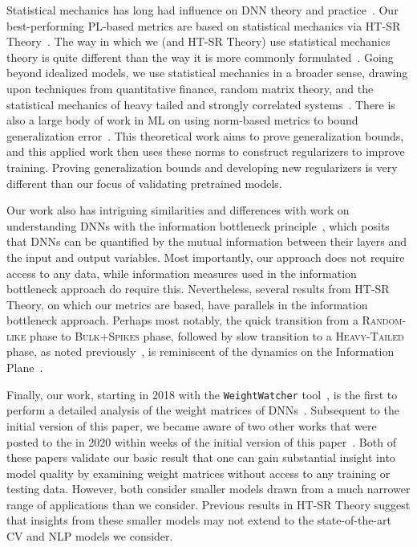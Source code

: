 Statistical mechanics has long had influence on DNN theory and practice~\cite{EB01_BOOK, MM17_TR, BKPx20}.
Our best-performing PL-based metrics are based on statistical mechanics via HT-SR Theory~\cite{MM17_TR, MM18_TR, MM19_HTSR_ICML, MM19_KDD, MM20_SDM}.
The way in which we (and HT-SR Theory) use statistical mechanics theory is quite different than the way it is more commonly formulated~\cite{EB01_BOOK, BKPx20}.
Going beyond idealized models, we use statistical mechanics in a broader sense, drawing upon techniques from quantitative finance, random matrix theory, and the statistical mechanics of heavy tailed and strongly correlated systems~\cite{BouchaudPotters03, SornetteBook, BP11, bun2017}.
There is also a large body of work in ML on using norm-based metrics to bound generalization error~\cite{NTS15, BFT17_TR, LMBx18_TR}.
This theoretical work aims to prove generalization bounds, and this applied work then uses these norms to construct regularizers to improve training.
Proving generalization bounds and developing new regularizers is very different than our focus of validating pretrained models.

Our work also has intriguing similarities and differences with work on understanding DNNs with the information bottleneck principle~\cite{TZ15,ST17_TR}, which posits that DNNs can be quantified by the mutual information between their layers and the input and output variables.
Most importantly, our approach does not require access to any data, while information measures used in the information bottleneck approach do require this.
Nevertheless, several results from HT-SR Theory, on which our metrics are based, have parallels in the information bottleneck approach.
Perhaps most notably, the quick transition from a \textsc{Random-like} phase to \textsc{Bulk+Spikes} phase, followed by slow transition to a \textsc{Heavy-Tailed} phase, as noted previously~\cite{MM18_TR}, is reminiscent of the dynamics on the Information Plane~\cite{ST17_TR}.

Finally, 
our work, starting in 2018 with the \texttt{WeightWatcher} tool~\cite{weightwatcher_package}, is the first to perform a detailed analysis of the weight matrices of DNNs~\cite{MM18_TR, MM19_HTSR_ICML, MM20_SDM}.
Subsequent to the initial version of this paper, we became aware of two other works that were posted to the in 2020 within weeks of the initial version of this paper~\cite{EJRUY20_TR,UKGBT20_TR}.
Both of these papers validate our basic result that one can gain substantial insight into model quality by examining weight matrices without access to any training or testing data.
However, both consider smaller models drawn from a much narrower range of applications than we consider.
Previous results in HT-SR Theory suggest that insights from these smaller models may not extend to the state-of-the-art CV and NLP models we consider.


